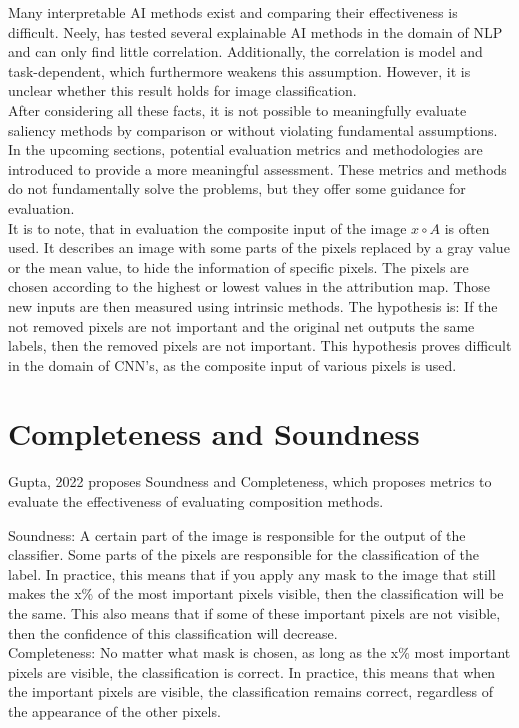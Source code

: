 Many interpretable AI methods exist and comparing their effectiveness is difficult. Neely, \cite{neely2021order} has tested several explainable AI methods in the domain of NLP and can only find little correlation. Additionally, the correlation is model and task-dependent, which furthermore weakens this assumption. However, it is unclear whether this result holds for image classification.
\\
After considering all these facts, it is not possible to meaningfully evaluate saliency methods by comparison or without violating fundamental assumptions. In the upcoming sections, potential evaluation metrics and methodologies are introduced to provide a more meaningful assessment. These metrics and methods do not fundamentally solve the problems, but they offer some guidance for evaluation.
\\
It is to note, that in evaluation the composite input of the image $x \circ A$ is often used. It describes an image with some parts of the pixels replaced by a gray value or the mean value, to hide the information of specific pixels. The pixels are chosen according to the highest or lowest values in the attribution map. Those new inputs are then measured using intrinsic methods. The hypothesis is: If the not removed pixels are not important and the original net outputs the same labels, then the removed pixels are not important. This hypothesis proves difficult in the domain of CNN's, as the composite input of various pixels is used. 

\section{Completeness and Soundness}

Gupta, 2022 \cite{gupta2022new} proposes Soundness and Completeness, which proposes metrics to evaluate the effectiveness of evaluating composition methods.

Soundness: A certain part of the image is responsible for the output of the classifier. Some parts of the pixels are responsible for the classification of the label. In practice, this means that if you apply any mask to the image that still makes the x\% of the most important pixels visible, then the classification will be the same. This also means that if some of these important pixels are not visible, then the confidence of this classification will decrease. \\
Completeness: No matter what mask is chosen, as long as the x\% most important pixels are visible, the classification is correct. In practice, this means that when the important pixels are visible, the classification remains correct, regardless of the appearance of the other pixels.\\


